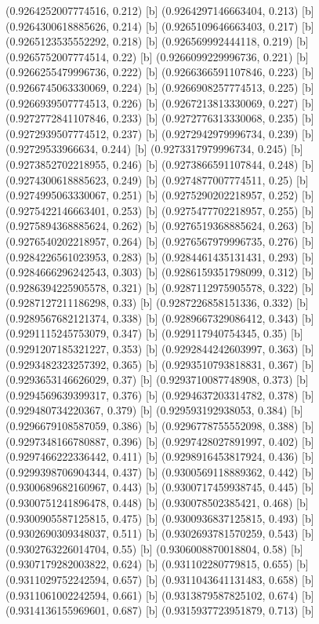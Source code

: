 {{{(0.9264252007774516, 0.212) [b] 
(0.9264297146663404, 0.213) [b] 
(0.9264300618885626, 0.214) [b] 
(0.9265109646663403, 0.217) [b] 
(0.9265123535552292, 0.218) [b] 
(0.926569992444118, 0.219) [b] 
(0.9265752007774514, 0.22) [b] 
(0.9266099229996736, 0.221) [b] 
(0.9266255479996736, 0.222) [b] 
(0.9266366591107846, 0.223) [b] 
(0.9266745063330069, 0.224) [b] 
(0.9266908257774513, 0.225) [b] 
(0.9266939507774513, 0.226) [b] 
(0.9267213813330069, 0.227) [b] 
(0.9272772841107846, 0.233) [b] 
(0.9272776313330068, 0.235) [b] 
(0.9272939507774512, 0.237) [b] 
(0.9272942979996734, 0.239) [b] 
(0.92729533966634, 0.244) [b] 
(0.9273317979996734, 0.245) [b] 
(0.9273852702218955, 0.246) [b] 
(0.9273866591107844, 0.248) [b] 
(0.9274300618885623, 0.249) [b] 
(0.9274877007774511, 0.25) [b] 
(0.9274995063330067, 0.251) [b] 
(0.9275290202218957, 0.252) [b] 
(0.9275422146663401, 0.253) [b] 
(0.9275477702218957, 0.255) [b] 
(0.9275894368885624, 0.262) [b] 
(0.9276519368885624, 0.263) [b] 
(0.9276540202218957, 0.264) [b] 
(0.9276567979996735, 0.276) [b] 
(0.9284226561023953, 0.283) [b] 
(0.9284461435131431, 0.293) [b] 
(0.9284666296242543, 0.303) [b] 
(0.9286159351798099, 0.312) [b] 
(0.9286394225905578, 0.321) [b] 
(0.9287112975905578, 0.322) [b] 
(0.9287127211186298, 0.33) [b] 
(0.9287226858151336, 0.332) [b] 
(0.9289567682121374, 0.338) [b] 
(0.9289667329086412, 0.343) [b] 
(0.9291115245753079, 0.347) [b] 
(0.929117940754345, 0.35) [b] 
(0.9291207185321227, 0.353) [b] 
(0.9292844242603997, 0.363) [b] 
(0.9293482323257392, 0.365) [b] 
(0.9293510793818831, 0.367) [b] 
(0.9293653146626029, 0.37) [b] 
(0.9293710087748908, 0.373) [b] 
(0.9294569639399317, 0.376) [b] 
(0.9294637203314782, 0.378) [b] 
(0.929480734220367, 0.379) [b] 
(0.929593192938053, 0.384) [b] 
(0.9296679108587059, 0.386) [b] 
(0.9296778755552098, 0.388) [b] 
(0.9297348166780887, 0.396) [b] 
(0.9297428027891997, 0.402) [b] 
(0.9297466222336442, 0.411) [b] 
(0.9298916453817924, 0.436) [b] 
(0.9299398706904344, 0.437) [b] 
(0.9300569118889362, 0.442) [b] 
(0.9300689682160967, 0.443) [b] 
(0.9300717459938745, 0.445) [b] 
(0.9300751241896478, 0.448) [b] 
(0.930078502385421, 0.468) [b] 
(0.9300905587125815, 0.475) [b] 
(0.9300936837125815, 0.493) [b] 
(0.9302690309348037, 0.511) [b] 
(0.9302693781570259, 0.543) [b] 
(0.9302763226014704, 0.55) [b] 
(0.9306008870018804, 0.58) [b] 
(0.9307179282003822, 0.624) [b] 
(0.931102280779815, 0.655) [b] 
(0.9311029752242594, 0.657) [b] 
(0.9311043641131483, 0.658) [b] 
(0.9311061002242594, 0.661) [b] 
(0.9313879587825102, 0.674) [b] 
(0.9314136155969601, 0.687) [b] 
(0.9315937723951879, 0.713) [b] 
}}}

